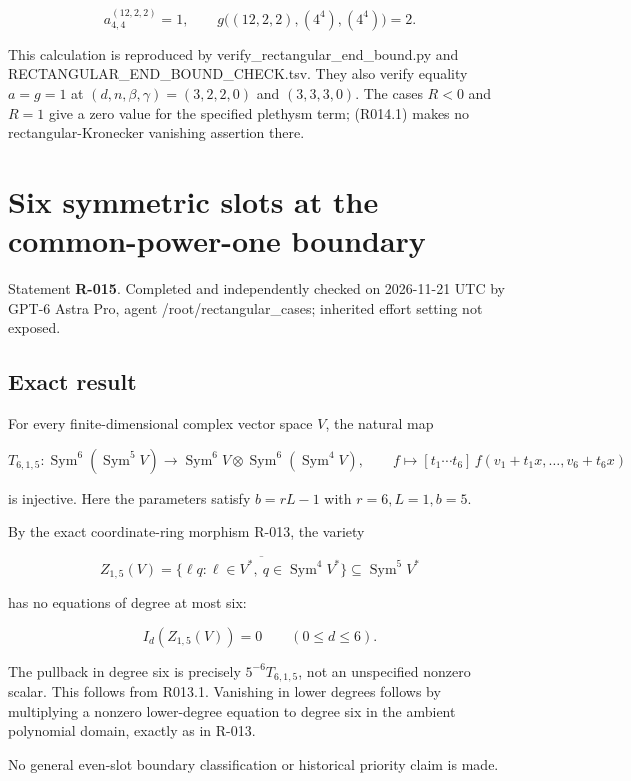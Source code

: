 \documentclass[
  10pt,
]{article}
\begin{document}
\[
 a_{4,4}^{(12,2,2)}=1,\qquad
 g\bigl((12,2,2),(4^4),(4^4)\bigr)=2.
\]

This calculation is reproduced by verify\_rectangular\_end\_bound.py and
RECTANGULAR\_END\_BOUND\_CHECK.tsv. They also verify equality \(a=g=1\)
at \((d,n,\beta,\gamma)=(3,2,2,0)\) and \((3,3,3,0)\). The cases \(R<0\)
and \(R=1\) give a zero value for the specified plethysm term; (R014.1)
makes no rectangular-Kronecker vanishing assertion there.

\section{Six symmetric slots at the common-power-one
boundary}\label{six-symmetric-slots-at-the-common-power-one-boundary}

Statement \textbf{R-015}. Completed and independently checked on
2026-11-21 UTC by GPT-6 Astra Pro, agent /root/rectangular\_cases;
inherited effort setting not exposed.

\subsection{Exact result}\label{exact-result}

For every finite-dimensional complex vector space \(V\), the natural map

\[
 T_{6,1,5}:\operatorname{Sym}^6(\operatorname{Sym}^5V)
 \longrightarrow
 \operatorname{Sym}^6V\otimes\operatorname{Sym}^6(\operatorname{Sym}^4V),
 \qquad
 f\longmapsto[t_1\cdots t_6]\,
 f(v_1+t_1x,\ldots,v_6+t_6x)
\]

is injective. Here the parameters satisfy \(b=rL-1\) with
\(r=6,L=1,b=5\).

By the exact coordinate-ring morphism R-013, the variety

\[
 Z_{1,5}(V)=\overline{\{\ell q:
        \ell\in V^*,\ q\in\operatorname{Sym}^4V^*\}}
       \subseteq\operatorname{Sym}^5V^*
\]

has no equations of degree at most six:

\[
 I_d(Z_{1,5}(V))=0\qquad(0\le d\le6).
\]

The pullback in degree six is precisely \(5^{-6}T_{6,1,5}\), not an
unspecified nonzero scalar. This follows from R013.1. Vanishing in lower
degrees follows by multiplying a nonzero lower-degree equation to degree
six in the ambient polynomial domain, exactly as in R-013.

No general even-slot boundary classification or historical priority
claim is made.
\end{document}
